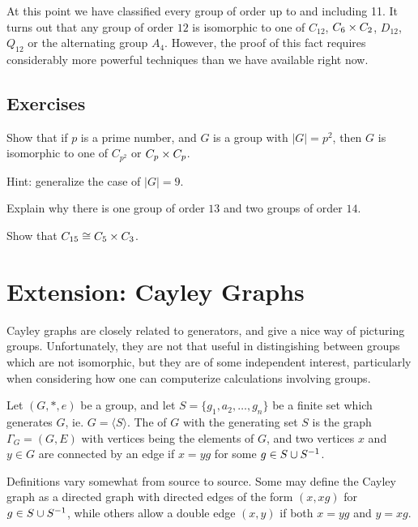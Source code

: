 At this point we have classified every group of order up to and including 11. 
It turns out that any group of order $12$ is isomorphic to one of $C_{12}$,
$C_{6} \times C_{2}$, $D_{12}$, $Q_{12}$ or the alternating group $A_{4}$.
However, the proof of this fact requires considerably more powerful techniques
than we have available right now.

\subsection*{Exercises}

\begin{exercises}
  \item Show that if $p$ is a prime number, and $G$ is a group with $|G| =
  p^{2}$, then $G$ is isomorphic to one of $C_{p^{2}}$ or $C_{p} \times C_{p}$.
  
  Hint: generalize the case of $|G| = 9$.
  
  \item Explain why there is one group of order $13$ and two groups 
    of order $14$.
  
  \item Show that $C_{15} \cong C_{5} \times C_{3}$.
\end{exercises}

\section{Extension: Cayley Graphs}

Cayley graphs are closely related to generators, and give a nice way 
of picturing groups.  Unfortunately, they are not that useful in 
distingishing between groups which are not isomorphic, but they are 
of some independent interest, particularly when considering how one 
can computerize calculations involving groups.

\begin{definition}
  Let $(G, \ast, e)$ be a group, and let $S = \{ g_{1}, a_{2}, 
  \ldots, g_{n}\}$ be a finite set which generates $G$, ie. $G = 
  \langle S \rangle$.  The  of $G$ 
  with the generating set $S$ is the graph $\Gamma_{G} = (G, E)$ 
  with vertices being the elements of $G$, and two vertices $x$ and
  $y \in G$ are connected by an edge if $x = yg$ for some
  $g \in S \cup S^{-1}$.
\end{definition}

Definitions vary somewhat from source to source.  Some may define the Cayley
graph as a directed graph with directed edges of the form $(x, xg)$ for
$g \in S \cup S^{-1}$, while others allow a double edge $(x,y)$ if
both $x = yg$ and $y = xg$.

